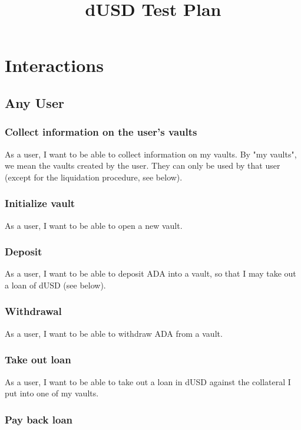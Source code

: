 \documentclass{article} %
\title{dUSD Test Plan}
\begin{document}
\maketitle


\section{Interactions}


\subsection{Any User}

\subsubsection{Collect information on the user's vaults}

As a user, I want to be able to collect information on my vaults. By "my
vaults", we mean the vaults created by the user. They can only be used by that
user (except for the liquidation procedure, see below).

\subsubsection{Initialize vault}

As a user, I want to be able to open a new vault.

\subsubsection{Deposit}

As a user, I want to be able to deposit ADA into a vault, so that I may take out
a loan of dUSD (see below).

\subsubsection{Withdrawal}

As a user, I want to be able to withdraw ADA from a vault.

\subsubsection{Take out loan}

As a user, I want to be able to take out a loan in dUSD against the collateral I
put into one of my vaults.

\subsubsection{Pay back loan}
\end{document}
